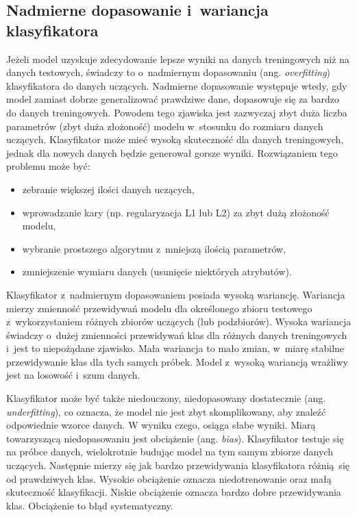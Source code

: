 \subsection{Nadmierne dopasowanie i~wariancja klasyfikatora}
Jeżeli model uzyskuje zdecydowanie lepsze wyniki na danych treningowych niż na danych testowych, świadczy to o~nadmiernym dopasowaniu (ang. \textit{overfitting}) klasyfikatora do danych uczących. Nadmierne dopasowanie występuje wtedy, gdy model zamiast dobrze generalizować prawdziwe dane, dopasowuje się za bardzo do danych treningowych. Powodem tego zjawiska jest zazwyczaj zbyt duża liczba parametrów (zbyt duża złożoność) modelu w~stosunku do rozmiaru danych uczących. Klasyfikator może mieć wysoką skuteczność dla danych treningowych, jednak dla nowych danych będzie generował gorsze wyniki. Rozwiązaniem tego problemu może być:
\begin{itemize}
	\item zebranie większej ilości danych uczących,
	\item wprowadzanie kary (np. regularyzacja L1 lub L2) za zbyt dużą złożoność modelu,
	\item wybranie prostszego algorytmu z~mniejszą ilością parametrów,
	\item zmniejszenie wymiaru danych (usunięcie niektórych atrybutów).
\end{itemize}

Klasyfikator z~nadmiernym dopasowaniem posiada wysoką wariancję. Wariancja mierzy zmienność przewidywań modelu dla określonego zbioru testowego z~wykorzystaniem różnych zbiorów uczących (lub podzbiorów). Wysoka wariancja świadczy o~dużej zmienności przewidywań klas dla różnych danych treningowych i~jest to niepożądane zjawisko. Mała wariancja to mało zmian, w~miarę stabilne przewidywanie klas dla tych samych próbek. Model z~wysoką wariancją wrażliwy jest na losowość i~szum danych. \par
Klasyfikator może być także niedouczony, niedopasowany dostatecznie (ang. \textit{underfitting}), co oznacza, że model nie jest zbyt skomplikowany, aby znaleźć odpowiednie wzorce danych. W wyniku czego, osiąga słabe wyniki. Miarą towarzyszącą niedopasowaniu jest obciążenie (ang. \textit{bias}). Klasyfikator testuje się na próbce danych, wielokrotnie budując model na tym samym zbiorze danych uczących. Następnie mierzy się jak bardzo przewidywania klasyfikatora różnią się od prawdziwych klas. Wysokie obciążenie oznacza niedotrenowanie oraz małą skuteczność klasyfikacji. Niskie obciążenie oznacza bardzo dobre przewidywania klas. Obciążenie to błąd systematyczny. \par

